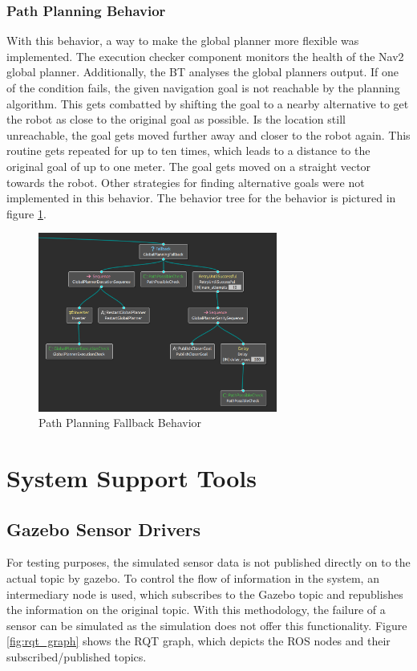 \subsubsection{Path Planning Behavior}

With this behavior, a way to make the global planner more flexible was implemented. 
The execution checker component monitors the health of the Nav2 global planner. Additionally, the BT analyses the global planners output. If one of the condition fails, the given navigation goal is not reachable by the planning algorithm. This gets combatted by shifting the goal to a nearby alternative to get the robot as close to the original goal as possible. Is the location still unreachable, the goal gets moved further away and closer to the robot again. This routine gets repeated for up to ten times, which leads to a distance to the original goal of up to one meter. 
The goal gets moved on a straight vector towards the robot. Other strategies for finding alternative goals were not implemented in this behavior. The behavior tree for the behavior is pictured in figure \ref{fig:global_planning_fallback}.

\begin{center}
	\begin{figure}[ht]
	\label{fig:global_planning_fallback}
	\includegraphics[width=0.7\textwidth]{images/global_planning_fallback.png}
	\caption{Path Planning Fallback Behavior}
	\end{figure}
\end{center}




\section{System Support Tools}
\subsection{Gazebo Sensor Drivers}
For testing purposes, the simulated sensor data is not published directly on to the actual topic by gazebo. To control the flow of information in the system, an intermediary node is used, which subscribes to the Gazebo topic and republishes the information on the original topic. With this methodology, the failure of a sensor can be simulated as the simulation does not offer this functionality. Figure \ref{fig:rqt_graph} shows the RQT graph, which depicts the ROS nodes and their subscribed/published topics. 

